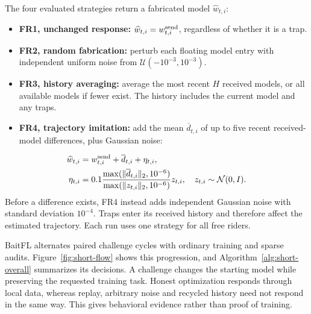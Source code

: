 \documentclass[conference]{IEEEtran}
\makeatletter
\renewcommand{\section}{\@startsection{section}{1}{\z@}{1.5ex}{0.7ex}{\normalfont\normalsize\centering\scshape}}
\makeatother
\begin{document}
The four evaluated strategies return a fabricated model $\widehat w_{t,i}$:
\begin{itemize}
\item \textbf{FR1, unchanged response:}
$\widehat w_{t,i}=w^{\rm send}_{t,i}$, regardless of whether it is a trap.
\item \textbf{FR2, random fabrication:} perturb each floating model entry
with independent uniform noise from $\mathcal U(-10^{-3},10^{-3})$.
\item \textbf{FR3, history averaging:} average the most recent $H$
received models, or all available models if fewer exist. The history
includes the current model and any traps.
\item \textbf{FR4, trajectory imitation:} add the mean $\overline d_{t,i}$
of up to five recent received-model differences, plus Gaussian noise:
\end{itemize}
\begin{equation}
\begin{split}
\widehat w_{t,i}&=w^{\rm send}_{t,i}+\overline d_{t,i}+\eta_{t,i},\\
\eta_{t,i}&=0.1\frac{\max(\|\overline d_{t,i}\|_2,10^{-6})}
 {\max(\|z_{t,i}\|_2,10^{-6})}z_{t,i},\quad z_{t,i}\sim\mathcal N(0,I).
\end{split}
\end{equation}
Before a difference exists, FR4 instead adds independent Gaussian noise
with standard deviation $10^{-4}$. Traps enter its received history and
therefore affect the estimated trajectory. Each run uses one strategy
for all free riders.

\section{BaitFL Methodology}\label{sec:method-short}
BaitFL alternates paired challenge cycles with ordinary training and
sparse audits. Figure~\ref{fig:short-flow} shows this progression, and
Algorithm~\ref{alg:short-overall} summarizes its decisions. A challenge
changes the starting model while preserving the requested training task.
Honest optimization responds through local data, whereas replay, arbitrary
noise and recycled history need not respond in the same way. This gives
behavioral evidence rather than proof of training.
\end{document}
